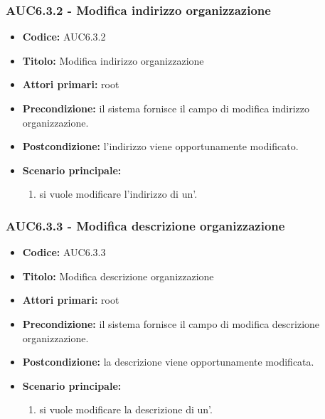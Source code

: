 \documentclass[casi-duso]{subfiles}
\begin{document}
\subsubsection{AUC6.3.2 - Modifica indirizzo organizzazione}%
\label{subsub:AUC6.3.2}
\begin{itemize}
  \item \textbf{Codice:} AUC6.3.2
  \item \textbf{Titolo:} Modifica indirizzo organizzazione
  \item \textbf{Attori primari:} root
  \item \textbf{Precondizione:} il sistema fornisce il campo di modifica indirizzo organizzazione.
  \item \textbf{Postcondizione:} l'indirizzo viene opportunamente modificato.
  \item \textbf{Scenario principale:}
  \begin{enumerate}
    \item si vuole modificare l'indirizzo di un'.
  \end{enumerate}
\end{itemize}

\subsubsection{AUC6.3.3 - Modifica descrizione organizzazione}%
\label{subsub:AUC6.3.3}
\begin{itemize}
  \item \textbf{Codice:} AUC6.3.3
  \item \textbf{Titolo:} Modifica descrizione organizzazione
  \item \textbf{Attori primari:} root
  \item \textbf{Precondizione:} il sistema fornisce il campo di modifica descrizione organizzazione.
  \item \textbf{Postcondizione:} la descrizione viene opportunamente modificata.
  \item \textbf{Scenario principale:}
  \begin{enumerate}
    \item si vuole modificare la descrizione di un'.
  \end{enumerate}
\end{itemize}
\end{document}
